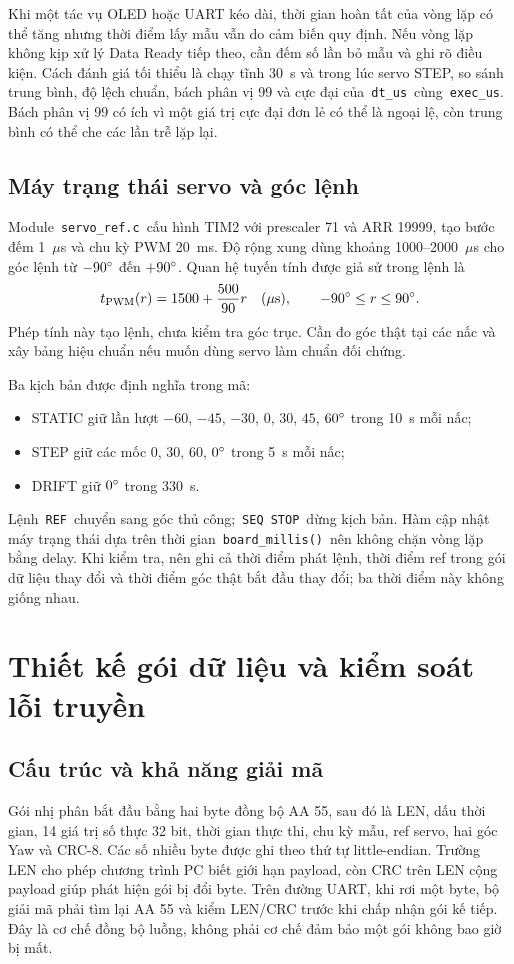 Khi một tác vụ OLED hoặc UART kéo dài, thời gian hoàn tất của vòng lặp có thể tăng nhưng thời điểm lấy mẫu vẫn do cảm biến quy định. Nếu vòng lặp không kịp xử lý Data Ready tiếp theo, cần đếm số lần bỏ mẫu và ghi rõ điều kiện. Cách đánh giá tối thiểu là chạy tĩnh 30~s và trong lúc servo STEP, so sánh trung bình, độ lệch chuẩn, bách phân vị 99 và cực đại của \,\texttt{dt\_us}\, cùng \,\texttt{exec\_us}. Bách phân vị 99 có ích vì một giá trị cực đại đơn lẻ có thể là ngoại lệ, còn trung bình có thể che các lần trễ lặp lại.

\subsection{Máy trạng thái servo và góc lệnh}
Module \,\texttt{servo\_ref.c}\, cấu hình TIM2 với prescaler 71 và ARR 19999, tạo bước đếm 1~$\mu$s và chu kỳ PWM 20~ms. Độ rộng xung dùng khoảng 1000--2000~$\mu$s cho góc lệnh từ $-90^{\circ}$ đến $+90^{\circ}$. Quan hệ tuyến tính được giả sử trong lệnh là
\begin{equation}
t_{\rm PWM}(r)=1500+\frac{500}{90}r\quad(\mu\mathrm{s}),\qquad -90^{\circ}\leq r\leq90^{\circ}.
\end{equation}
Phép tính này tạo lệnh, chưa kiểm tra góc trục. Cần đo góc thật tại các nấc và xây bảng hiệu chuẩn nếu muốn dùng servo làm chuẩn đối chứng.

Ba kịch bản được định nghĩa trong mã:
\begin{itemize}
\item STATIC giữ lần lượt $-60$, $-45$, $-30$, $0$, $30$, $45$, $60^{\circ}$ trong 10~s mỗi nấc;
\item STEP giữ các mốc $0$, $30$, $60$, $0^{\circ}$ trong 5~s mỗi nấc;
\item DRIFT giữ $0^{\circ}$ trong 330~s.
\end{itemize}
Lệnh \,\texttt{REF}\, chuyển sang góc thủ công; \,\texttt{SEQ STOP}\, dừng kịch bản. Hàm cập nhật máy trạng thái dựa trên thời gian \,\texttt{board\_millis()}\, nên không chặn vòng lặp bằng delay. Khi kiểm tra, nên ghi cả thời điểm phát lệnh, thời điểm ref trong gói dữ liệu thay đổi và thời điểm góc thật bắt đầu thay đổi; ba thời điểm này không giống nhau.

\section{Thiết kế gói dữ liệu và kiểm soát lỗi truyền}
\subsection{Cấu trúc và khả năng giải mã}
Gói nhị phân bắt đầu bằng hai byte đồng bộ AA 55, sau đó là LEN, dấu thời gian, 14 giá trị số thực 32 bit, thời gian thực thi, chu kỳ mẫu, ref servo, hai góc Yaw và CRC-8. Các số nhiều byte được ghi theo thứ tự little-endian. Trường LEN cho phép chương trình PC biết giới hạn payload, còn CRC trên LEN cộng payload giúp phát hiện gói bị đổi byte. Trên đường UART, khi rơi một byte, bộ giải mã phải tìm lại AA 55 và kiểm LEN/CRC trước khi chấp nhận gói kế tiếp. Đây là cơ chế đồng bộ luồng, không phải cơ chế đảm bảo một gói không bao giờ bị mất.

